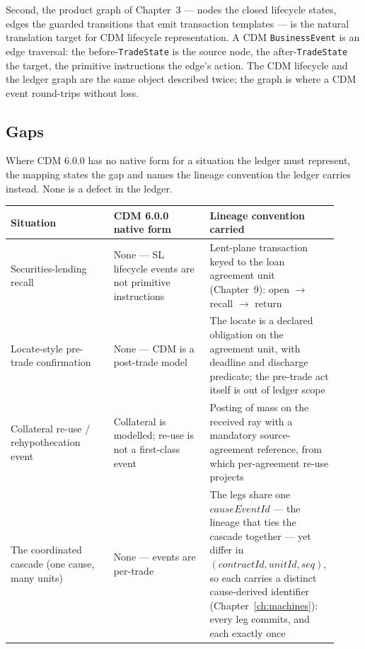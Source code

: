 \documentclass[11pt,a4paper]{article}
\begin{document}
Second, the product graph of Chapter~3 --- nodes the closed lifecycle states,
edges the guarded transitions that emit transaction templates --- is the natural
translation target for CDM lifecycle representation. A CDM \texttt{BusinessEvent}
is an edge traversal: the before-\texttt{TradeState} is the source node, the
after-\texttt{TradeState} the target, the primitive instructions the edge's
action. The CDM lifecycle and the ledger graph are the same object described
twice; the graph is where a CDM event round-trips without loss.

\subsection{Gaps}

Where CDM 6.0.0 has no native form for a situation the ledger must represent,
the mapping states the gap and names the lineage convention the ledger carries
instead. None is a defect in the ledger.

\begin{center}
\small
\begin{tabular}{@{}p{0.30\linewidth}p{0.28\linewidth}p{0.34\linewidth}@{}}
\toprule
\textbf{Situation} & \textbf{CDM 6.0.0 native form} & \textbf{Lineage convention carried} \\
\midrule
Securities-lending recall & None --- SL lifecycle events are not primitive
  instructions & Lent-plane transaction keyed to the loan agreement unit
  (Chapter~9): open $\to$ recall $\to$ return \\
Locate-style pre-trade confirmation & None --- CDM is a post-trade model & The
  locate is a declared obligation on the agreement unit, with deadline and
  discharge predicate; the pre-trade act itself is out of ledger scope \\
Collateral re-use / rehypothecation event & Collateral is modelled; re-use is
  not a first-class event & Posting of mass on the received ray with a
  mandatory source-agreement reference, from which per-agreement re-use projects \\
The coordinated cascade (one cause, many units) & None --- events are
  per-trade & The legs share one $\mathit{causeEventId}$ --- the lineage that ties
  the cascade together --- yet differ in $(\mathit{contractId},\mathit{unitId},\mathit{seq})$,
  so each carries a distinct cause-derived identifier (Chapter~\ref{ch:machines}):
  every leg commits, and each exactly once \\
\bottomrule
\end{tabular}
\end{center}
\end{document}
